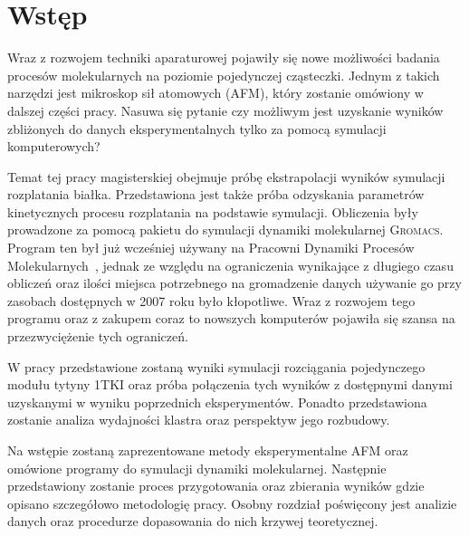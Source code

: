 \chapter{Wstęp}

\parskip=0pt
Wraz z rozwojem techniki aparaturowej pojawiły się nowe możliwości badania procesów molekularnych na poziomie pojedynczej cząsteczki. Jednym z takich narzędzi jest mikroskop sił atomowych (AFM), który zostanie omówiony w dalszej części pracy. Nasuwa się pytanie czy możliwym jest uzyskanie wyników zbliżonych do danych eksperymentalnych tylko za pomocą symulacji komputerowych?

Temat tej pracy magisterskiej obejmuje próbę ekstrapolacji wyników symulacji rozplatania białka. Przedstawiona jest także próba odzyskania parametrów kinetycznych procesu rozplatania na podstawie symulacji. Obliczenia były prowadzone za pomocą pakietu do symulacji dynamiki molekularnej \textsc{Gromacs}\cite{Gromacs_manual}. Program ten był już wcześniej używany na Pracowni Dynamiki Procesów Molekularnych~\cite{marek}, jednak ze względu na ograniczenia wynikające z długiego czasu obliczeń oraz ilości miejsca potrzebnego na gromadzenie danych używanie go przy zasobach dostępnych w 2007 roku było kłopotliwe. Wraz z rozwojem tego programu oraz z zakupem coraz to nowszych komputerów pojawiła się szansa na przezwyciężenie tych ograniczeń.

W pracy przedstawione zostaną wyniki symulacji rozciągania pojedynczego modułu tytyny 1TKI oraz próba połączenia tych wyników z dostępnymi danymi uzyskanymi w wyniku poprzednich eksperymentów. Ponadto przedstawiona zostanie analiza wydajności klastra oraz perspektyw jego rozbudowy.

Na wstępie zostaną zaprezentowane metody eksperymentalne AFM oraz omówione programy do symulacji dynamiki molekularnej. Następnie przedstawiony zostanie proces przygotowania oraz zbierania wyników gdzie opisano szczegółowo metodologię pracy. Osobny rozdział poświęcony jest analizie danych oraz procedurze dopasowania do nich krzywej teoretycznej.